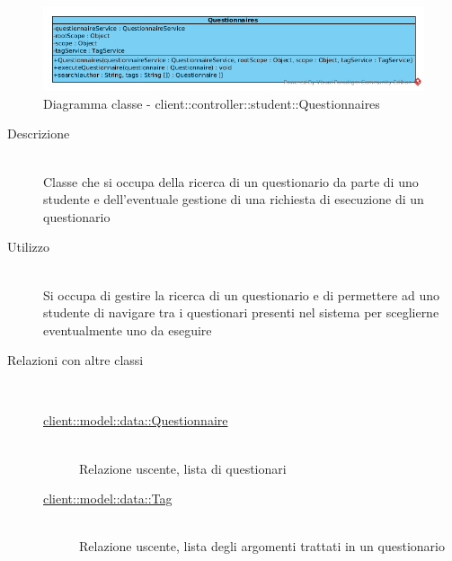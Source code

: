 \vspace{0.5cm}
\hypertarget{client::controller::student::Questionnaires}{}
\begin{center}
			\begin{figure}[H]
				\centering \includegraphics[scale=4, max width=\textwidth, max height=\myheight]{../img/diagrammiClassi/client/controller/student/Questionnaires.png}
				\caption{Diagramma classe - client::controller::student::Questionnaires}
			\end{figure}
		\end{center}\begin{description}
\item[Descrizione] \hfill \\
 Classe che si occupa della ricerca di un questionario da parte di uno studente e dell'eventuale gestione di una richiesta di esecuzione di un questionario
\item[Utilizzo] \hfill \\
 Si occupa di gestire la ricerca di un questionario e di permettere ad uno studente di navigare tra i questionari presenti nel sistema per sceglierne eventualmente uno da eseguire
\item[Relazioni con altre classi] \hfill \\
 \vspace{-7mm}
\begin{description}
\item[\hyperlink{client::model::data::Questionnaire}{client::model::data::Questionnaire}] \hfill \\
 Relazione uscente, lista di questionari
\item[\hyperlink{client::model::data::Tag}{client::model::data::Tag}] \hfill \\
 Relazione uscente, lista degli argomenti trattati in un questionario
\end{description}


\end{description}
